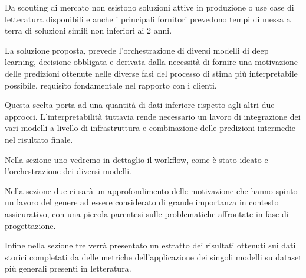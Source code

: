 Da scouting di mercato non esistono soluzioni attive in produzione o use case di letteratura disponibili e anche i principali fornitori prevedono tempi di messa a terra di soluzioni simili non inferiori ai 2 anni.

La soluzione proposta, prevede l'orchestrazione di diversi modelli di deep learning, decisione obbligata e derivata dalla necessità di fornire una motivazione delle predizioni ottenute nelle diverse fasi del processo di stima più interpretabile possibile, requisito fondamentale nel rapporto con i clienti.

Questa scelta porta ad una quantità di dati inferiore rispetto
agli altri due approcci. L'interpretabilità tuttavia rende necessario un lavoro di integrazione dei vari modelli a livello di infrastruttura e combinazione delle predizioni intermedie nel risultato finale.


Nella sezione uno vedremo in dettaglio il workflow, come è stato ideato e l'orchestrazione dei diversi modelli. 

Nella sezione due ci sarà un approfondimento delle motivazione che hanno spinto un lavoro del genere ad essere considerato di grande importanza in contesto assicurativo, con una piccola parentesi sulle problematiche affrontate in fase di progettazione.

Infine nella sezione tre verrà presentato un estratto dei risultati ottenuti sui dati storici completati da delle metriche dell'applicazione dei singoli modelli su dataset più generali presenti in letteratura. 




